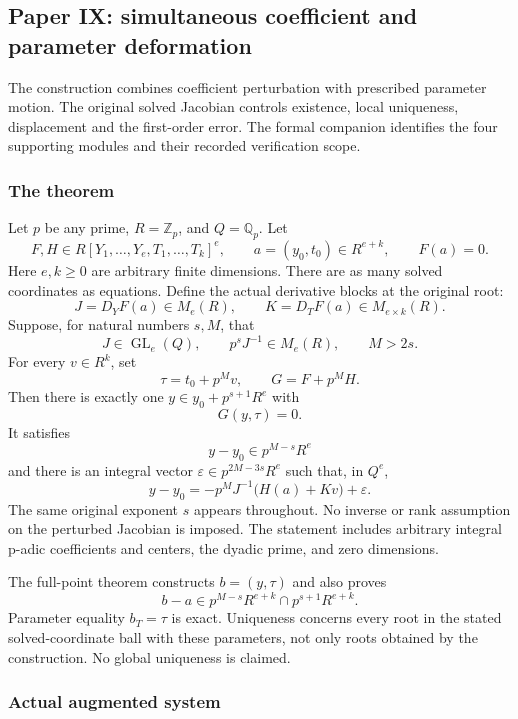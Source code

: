 \hypertarget{cont10:paper-ix-simultaneous-coefficient-and-parameter-deformation}{%
\subsection{Paper IX: simultaneous coefficient and parameter
deformation}\label{cont10:paper-ix-simultaneous-coefficient-and-parameter-deformation}}

The construction combines coefficient perturbation with prescribed parameter
motion. The original solved Jacobian controls existence, local
uniqueness, displacement and the first-order error. The formal companion identifies the four supporting modules and their
recorded verification scope.

\hypertarget{cont10:the-theorem}{%
\subsubsection{The theorem}\label{cont10:the-theorem}}

Let \(p\) be any prime, \(R=\mathbb Z_p\), and \(Q=\mathbb Q_p\). Let \[
F,H\in R[Y_1,\ldots,Y_e,T_1,\ldots,T_k]^e,
\qquad a=(y_0,t_0)\in R^{e+k},\qquad F(a)=0.
\] Here \(e,k\ge0\) are arbitrary finite dimensions. There are as many
solved coordinates as equations. Define the actual derivative blocks at
the original root: \[
J=D_YF(a)\in M_e(R),\qquad K=D_TF(a)\in M_{e\times k}(R).
\] Suppose, for natural numbers \(s,M\), that \[
J\in\operatorname{GL}_e(Q),\qquad p^sJ^{-1}\in M_e(R),\qquad M>2s.
\] For every \(v\in R^k\), set \[
\tau=t_0+p^Mv,\qquad G=F+p^MH.
\] Then there is exactly one \(y\in y_0+p^{s+1}R^e\) with \[
G(y,\tau)=0.
\] It satisfies \[
y-y_0\in p^{M-s}R^e
\] and there is an integral vector \(\varepsilon\in p^{2M-3s}R^e\) such
that, in \(Q^e\), \[
\boxed{\displaystyle
 y-y_0=-p^MJ^{-1}\bigl(H(a)+Kv\bigr)+\varepsilon.
}
\] The same original exponent \(s\) appears throughout. No inverse or
rank assumption on the perturbed Jacobian is imposed. The statement
includes arbitrary integral p-adic coefficients and centers, the dyadic
prime, and zero dimensions.

The full-point theorem constructs \(b=(y,\tau)\) and also proves \[
b-a\in p^{M-s}R^{e+k}\cap p^{s+1}R^{e+k}.
\] Parameter equality \(b_T=\tau\) is exact. Uniqueness concerns every
root in the stated solved-coordinate ball with these parameters, not
only roots obtained by the construction. No global uniqueness is
claimed.

\hypertarget{cont10:actual-augmented-system}{%
\subsubsection{Actual augmented system}\label{cont10:actual-augmented-system}}

